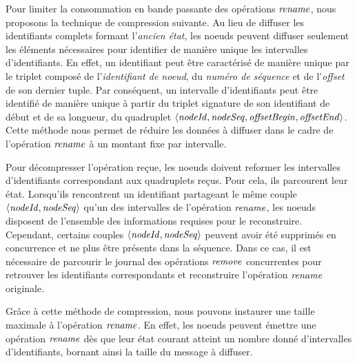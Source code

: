 
Pour limiter la consommation en bande passante des opérations $\mathit{rename}$, nous proposons la technique de compression suivante.
Au lieu de diffuser les identifiants complets formant l'\emph{ancien état}, les noeuds peuvent diffuser seulement les éléments nécessaires pour identifier de manière unique les intervalles d'identifiants.
En effet, un identifiant peut être caractérisé de manière unique par le triplet composé de l'\emph{identifiant de noeud}, du \emph{numéro de séquence} et de l'\emph{offset} de son dernier tuple.
Par conséquent, un intervalle d'identifiants peut être identifié de manière unique à partir du triplet signature de son identifiant de début et de sa longueur, \ie du quadruplet $\langle\mathit{nodeId}, \mathit{nodeSeq}, \mathit{offsetBegin}, \mathit{offsetEnd}\rangle$.
Cette méthode nous permet de réduire les données à diffuser dans le cadre de l'opération $\mathit{rename}$ à un montant fixe par intervalle.

Pour décompresser l'opération reçue, les noeuds doivent reformer les intervalles d'identifiants correspondant aux quadruplets reçus.
Pour cela, ils parcourent leur état.
Lorsqu'ils rencontrent un identifiant partageant le même couple $\langle\mathit{nodeId}, \mathit{nodeSeq}\rangle$ qu'un des intervalles de l'opération $\mathit{rename}$, les noeuds disposent de l'ensemble des informations requises pour le reconstruire.
Cependant, certains couples $\langle\mathit{nodeId}, \mathit{nodeSeq}\rangle$ peuvent avoir été supprimés en concurrence et ne plus être présents dans la séquence.
Dans ce cas, il est nécessaire de parcourir le journal des opérations $\mathit{remove}$ concurrentes pour retrouver les identifiants correspondants et reconstruire l'opération $\mathit{rename}$ originale.

Grâce à cette méthode de compression, nous pouvons instaurer une taille maximale à l'opération $\mathit{rename}$.
En effet, les noeuds peuvent émettre une opération $\mathit{rename}$ dès que leur état courant atteint un nombre donné d'intervalles d'identifiants, bornant ainsi la taille du message à diffuser.
